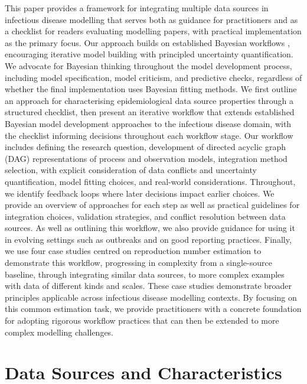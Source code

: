 \documentclass{article}
\begin{document}
This paper provides a framework for integrating multiple data sources in infectious disease modelling that serves both as guidance for practitioners and as a checklist for readers evaluating modelling papers, with practical implementation as the primary focus. 
Our approach builds on established Bayesian workflows \citep{gelman2020bayesian}, encouraging iterative model building with principled uncertainty quantification. We advocate for Bayesian thinking throughout the model development process, including model specification, model criticism, and predictive checks, regardless of whether the final implementation uses Bayesian fitting methods. 
We first outline an approach for characterising epidemiological data source properties through a structured checklist, then present an iterative workflow that extends established Bayesian model development approaches to the infectious disease domain, with the checklist informing decisions throughout each workflow stage. 
Our workflow includes defining the research question, development of directed acyclic graph (DAG) representations of process and observation models, integration method selection, with explicit consideration of data conflicts and uncertainty quantification, model fitting choices, and real-world considerations. Throughout, we identify feedback loops where later decisions impact earlier choices. 
We provide an overview of approaches for each step as well as practical guidelines for integration choices, validation strategies, and conflict resolution between data sources. 
As well as outlining this workflow, we also provide guidance for using it in evolving settings such as outbreaks and on good reporting practices.
Finally, we use four case studies centred on reproduction number estimation to demonstrate this workflow, progressing in complexity from a single-source baseline, through integrating similar data sources, to more complex examples with data of different kinds and scales. 
These case studies demonstrate broader principles applicable across infectious disease modelling contexts. 
By focusing on this common estimation task, we provide practitioners with a concrete foundation for adopting rigorous workflow practices that can then be extended to more complex modelling challenges.

\section{Data Sources and Characteristics} \label{sec:datareview}
\end{document}
